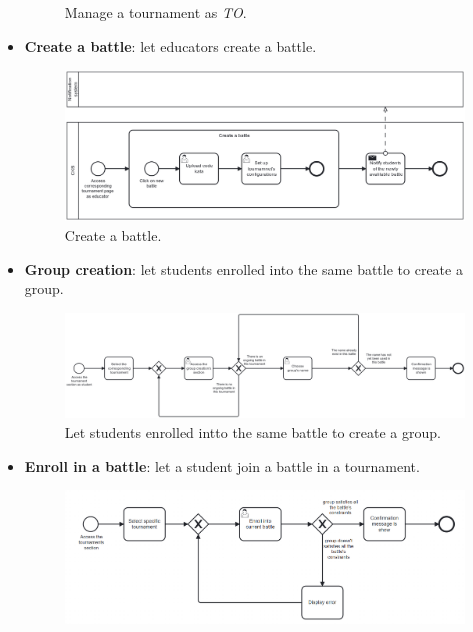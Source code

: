 \documentclass[../RASD.tex]{subfiles}
\begin{document}
\begin{itemize}
{\begin{figure}[h]
            \caption{Manage a tournament as \textit{TO}.}
            \label{img:bpmn_manage_tournament}
        \end{figure}
        \newpage
        }
        \item {\textbf{Create a battle}: let educators create a battle.
        \begin{figure}[h]
            \centering
            \includegraphics[width=\textwidth]{../assets/section_2/create_battle_definitive.png}
            \caption{Create a battle.}
            \label{img:bpmn_create_battle}
        \end{figure}
        \newpage
        }
        \item {\textbf{Group creation}: let students enrolled into the same battle to create a group.
        \begin{figure}[h]
            \centering
            \includegraphics[width=\textwidth]{../assets/section_2/group_creation_definitive.png}
            \caption{Let students enrolled intto the same battle to create a group.}
            \label{img:bpmn_group_creation}
        \end{figure}
        \newpage
        }
        \item {\textbf{Enroll in a battle}: let a student join a battle in a tournament.
        \begin{figure}[h]
            \centering
            \includegraphics[width=\textwidth]{../assets/section_2/enroll_in_a_battle_definitive.png}

\end{figure}}
\end{itemize}
\end{document}
